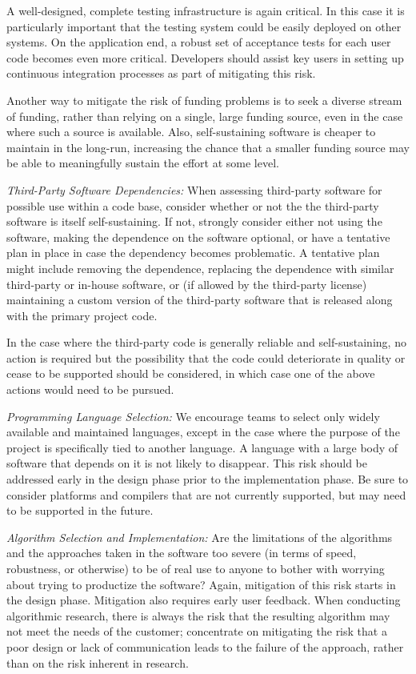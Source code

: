 \documentclass[11pt]{SANDreport}
\begin{document}
A well-designed, complete testing infrastructure is again critical.  In this
case it is particularly important that the testing system
could be easily deployed on other systems.  On the application end, a robust
set of acceptance tests for each user code becomes even more critical.
Developers should assist key users in setting up continuous integration
processes as part of mitigating this risk.

Another way to mitigate the risk of funding problems is to seek a diverse
stream of funding, rather than relying on a single, large funding source, even
in the case where such a source is available.  Also, self-sustaining software
is cheaper to maintain in the long-run, increasing the chance that a smaller
funding source may be able to meaningfully sustain the effort at some level.

\textit{Third-Party Software Dependencies:} When assessing third-party
software for possible use within a code base, consider whether or not the
the third-party software is itself self-sustaining.  If not, strongly
consider either not using the software, making the dependence on the software
optional, or have a tentative plan in place in case the dependency becomes
problematic.  A tentative plan might include removing the dependence, replacing
the dependence with similar third-party or in-house software, or (if allowed by
the third-party license) maintaining a custom version of the third-party
software that is released along with the primary project code.

In the case where the
third-party code is generally reliable and self-sustaining, no action is
required but the possibility that the code could deteriorate in quality or cease
to be supported should be considered, in which case one of the above actions
would need to be pursued.

\textit{Programming Language Selection:} We encourage teams to select only widely
available and maintained languages, except in the case where the purpose of
the project is specifically tied to another language.  A language with a large
body of software that depends on it is not likely to disappear.  This risk
should be addressed early in the design phase prior to the implementation
phase.  Be sure to consider platforms and compilers that are not currently
supported, but may need to be supported in the future.

\textit{Algorithm Selection and Implementation:} Are the limitations of the algorithms and the approaches taken
in the software too severe (in terms of speed, robustness, or otherwise) to be
of real use to anyone to bother with worrying about trying to productize
the software?  Again, mitigation of
this risk starts in the design phase.  Mitigation also requires early user
feedback.  When conducting algorithmic research, there is always the risk that
the resulting algorithm may not meet the needs of the customer; concentrate
on mitigating the risk that a poor design or lack of communication leads to
the failure of the approach, rather than on the risk inherent in research.
\end{document}
